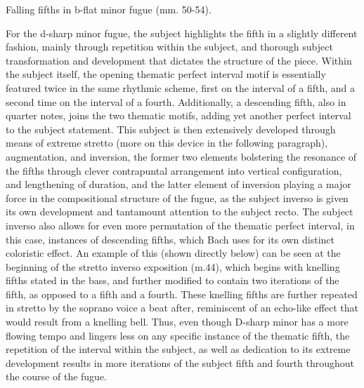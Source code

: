 \begin{Example}[H]
\vspace{1.5em}
    \centering
    \caption{ Falling fifths in b-flat minor fugue (mm. 50-54). }
\end{Example}    
    For the d-sharp minor fugue, the subject highlights the fifth in a
slightly different fashion, mainly through repetition within the
subject, and thorough subject transformation and development that
dictates the structure of the piece. Within the subject itself, the
opening thematic perfect interval motif is essentially featured twice in
the same rhythmic scheme, first on the interval of a fifth, and a second
time on the interval of a fourth. Additionally, a descending fifth, also
in quarter notes, joins the two thematic motifs, adding yet another
perfect interval to the subject statement. This subject is then
extensively developed through means of extreme stretto (more on this
device in the following paragraph), augmentation, and inversion, the
former two elements bolstering the resonance of the fifths through
clever contrapuntal arrangement into vertical configuration, and
lengthening of duration, and the latter element of inversion playing a
major force in the compositional structure of the fugue, as the subject
inverso is given its own development and tantamount attention to the
subject recto. The subject inverso also allows for even more permutation
of the thematic perfect interval, in this case, instances of descending
fifths, which Bach uses for its own distinct coloristic effect. An
example of this (shown directly below) can be seen at the beginning of
the stretto inverso exposition (m.44), which begins with knelling fifths
stated in the bass, and further modified to contain two iterations of
the fifth, as opposed to a fifth and a fourth. These knelling fifths are
further repeated in stretto by the soprano voice a beat after,
reminiscent of an echo-like effect that would result from a knelling
bell. Thus, even though D-sharp minor has a more flowing tempo and
lingers less on any specific instance of the thematic fifth, the
repetition of the interval within the subject, as well as dedication to
its extreme development results in more iterations of the subject fifth
and fourth throughout the course of the fugue.



